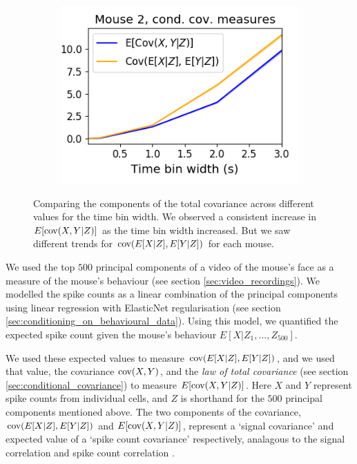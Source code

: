 \begin{figure}[h]
\begin{subfigure}[h]{0.5\linewidth}
      \includegraphics[width=\linewidth]{figures/eight_probe/Robbins_cond_cov_comparison.png}
      \label{fig:Robbins_cond_cov_comparison}
    \end{subfigure}
    \caption{Comparing the components of the total covariance across different values for the time bin width. We observed a consistent increase in $E[\text{cov} (X,Y|Z)]$ as the time bin width increased. But we saw different trends for $\text{cov} (E[X|Z], E[Y|Z])$ for each mouse.}
    \label{fig:conditional_covariance_comparison}
  \end{figure}

  We used the top $500$ principal components of a video of the mouse's face as a measure of the mouse's behaviour (see section \ref{sec:video_recordings}). We modelled the spike counts as a linear combination of the principal components using linear regression with ElasticNet regularisation (see section \ref{sec:conditioning_on_behavioural_data}). Using this model, we quantified the expected spike count given the mouse's behaviour $E[X|Z_1, \dots ,Z_{500}]$.

  We used these expected values to measure $\text{cov} (E[X|Z], E[Y|Z])$, and we used that value, the covariance $\text{cov} (X,Y)$, and the \textit{law of total covariance} (see section \ref{sec:conditional_covariance}) to measure $E[\text{cov} (X,Y|Z)]$. Here $X$ and $Y$ represent spike counts from individual cells, and $Z$ is shorthand for the $500$ principal components mentioned above. The two components of the covariance, $\text{cov} (E[X|Z], E[Y|Z])$ and $E[\text{cov} (X,Y|Z)]$, represent a `signal covariance' and expected value of a `spike count covariance' respectively, analagous to the signal correlation and spike count correlation \parencite{cohen2}.

